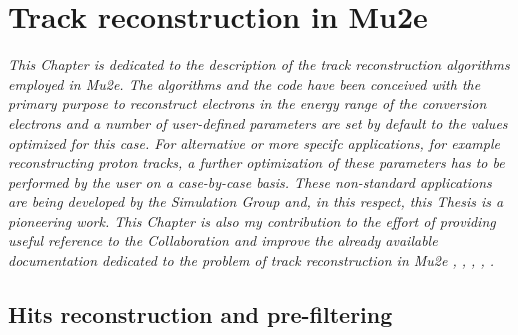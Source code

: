 \documentclass[12pt,a4paper,openright, oneside, titlepage]{book} %
\begin{document}
\chapter{Track reconstruction in Mu2e}
{\itshape This Chapter is dedicated to the description of the track reconstruction algorithms employed in Mu2e. 
The algorithms and the  code have been conceived with the primary purpose 
to reconstruct electrons in the energy range of the conversion electrons 
and a number of user-defined parameters are set by default to the values optimized for this  case.
For alternative or more specifc applications, for example reconstructing proton tracks, 
a further optimization of these parameters has to be performed by the user
on a case-by-case basis.
These non-standard applications are being developed by the 
Simulation Group and, in this respect, this Thesis is a pioneering work.
This Chapter is also my contribution to the effort of providing 
useful reference to the Collaboration and improve the
already available documentation dedicated to the problem of track reconstruction in Mu2e \cite{GianiPatRec:2016}, \cite{GianiPatRec:2020}, \cite{Brown:2014}, \cite{Kalman},  \cite{KutschkePaper}.}

\section{Hits reconstruction and pre-filtering}
\end{document}
